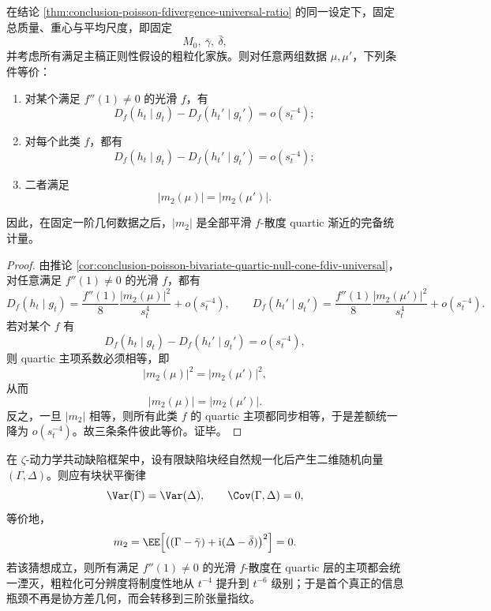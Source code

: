 \begin{theorem}\label{thm:conclusion-poisson-complex-second-moment-complete-for-all-f}
在结论 \ref{thm:conclusion-poisson-fdivergence-universal-ratio} 的同一设定下，固定总质量、重心与平均尺度，即固定
\[
M_0,\ \bar\gamma,\ \bar\delta,
\]
并考虑所有满足主稿正则性假设的粗粒化家族。则对任意两组数据 \(\mu,\mu'\)，下列条件等价：
\begin{enumerate}
  \item 对某个满足 \(f''(1)\neq 0\) 的光滑 \(f\)，有
  \[
  D_f(h_t\mid g_t)-D_f(h_t'\mid g_t')=o(s_t^{-4});
  \]
  \item 对每个此类 \(f\)，都有
  \[
  D_f(h_t\mid g_t)-D_f(h_t'\mid g_t')=o(s_t^{-4});
  \]
  \item 二者满足
  \[
  |m_2(\mu)|=|m_2(\mu')|.
  \]
\end{enumerate}
因此，在固定一阶几何数据之后，\(|m_2|\) 是全部平滑 \(f\)-散度 quartic 渐近的完备统计量。
\end{theorem}
\begin{proof}
由推论 \ref{cor:conclusion-poisson-bivariate-quartic-null-cone-fdiv-universal}，对任意满足 \(f''(1)\neq 0\) 的光滑 \(f\)，都有
\[
D_f(h_t\mid g_t)
=
\frac{f''(1)}{8}\frac{|m_2(\mu)|^2}{s_t^4}+o(s_t^{-4}),
\qquad
D_f(h_t'\mid g_t')
=
\frac{f''(1)}{8}\frac{|m_2(\mu')|^2}{s_t^4}+o(s_t^{-4}).
\]
若对某个 \(f\) 有
\[
D_f(h_t\mid g_t)-D_f(h_t'\mid g_t')=o(s_t^{-4}),
\]
则 quartic 主项系数必须相等，即
\[
|m_2(\mu)|^2=|m_2(\mu')|^2,
\]
从而
\[
|m_2(\mu)|=|m_2(\mu')|.
\]
反之，一旦 \(|m_2|\) 相等，则所有此类 \(f\) 的 quartic 主项都同步相等，于是差额统一降为 \(o(s_t^{-4})\)。故三条条件彼此等价。证毕。
\end{proof}

\begin{conjecture}\label{conj:conclusion-zeta-comoving-defect-natural-normalization-quartic-null-cone}
在 \(\zeta\)-动力学共动缺陷框架中，设有限缺陷块经自然规一化后产生二维随机向量 \((\Gamma,\Delta)\)。则应有块状平衡律
\[
\Var(\Gamma)=\Var(\Delta),
\qquad
\Cov(\Gamma,\Delta)=0,
\]
等价地，
\[
m_2=\EE\!\left[\bigl((\Gamma-\bar\gamma)+\mathrm{i}(\Delta-\bar\delta)\bigr)^2\right]=0.
\]
若该猜想成立，则所有满足 \(f''(1)\neq 0\) 的光滑 \(f\)-散度在 quartic 层的主项都会统一湮灭，粗粒化可分辨度将制度性地从 \(t^{-4}\) 提升到 \(t^{-6}\) 级别；于是首个真正的信息瓶颈不再是协方差几何，而会转移到三阶张量指纹。
\end{conjecture}

\endinput
